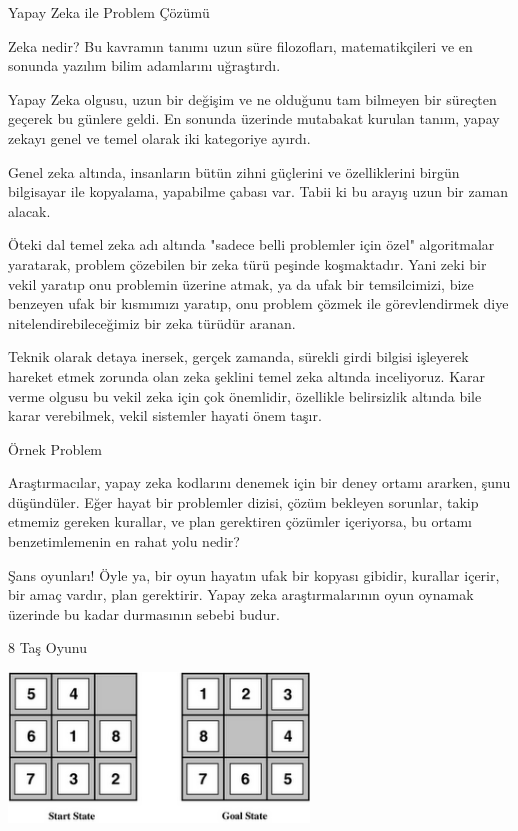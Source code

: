 \documentclass[12pt,fleqn]{article}\usepackage{../../common}
\begin{document}
Yapay Zeka ile Problem Çözümü

Zeka nedir? Bu kavramın tanımı uzun süre filozofları, matematikçileri ve en
sonunda yazılım bilim adamlarını uğraştırdı.

Yapay Zeka olgusu, uzun bir değişim ve ne olduğunu tam bilmeyen bir
süreçten geçerek bu günlere geldi. En sonunda üzerinde mutabakat kurulan
tanım, yapay zekayı genel ve temel olarak iki kategoriye ayırdı.

Genel zeka altında, insanların bütün zihni güçlerini ve özelliklerini
birgün bilgisayar ile kopyalama, yapabilme çabası var. Tabii ki bu arayış
uzun bir zaman alacak.

Öteki dal temel zeka adı altında "sadece belli problemler için özel"
algoritmalar yaratarak, problem çözebilen bir zeka türü peşinde
koşmaktadır. Yani zeki bir vekil yaratıp onu problemin üzerine atmak, ya da
ufak bir temsilcimizi, bize benzeyen ufak bir kısmımızı yaratıp, onu
problem çözmek ile görevlendirmek diye nitelendirebileceğimiz bir zeka
türüdür aranan.

Teknik olarak detaya inersek, gerçek zamanda, sürekli girdi bilgisi
işleyerek hareket etmek zorunda olan zeka şeklini temel zeka altında
inceliyoruz. Karar verme olgusu bu vekil zeka için çok önemlidir, özellikle
belirsizlik altında bile karar verebilmek, vekil sistemler hayati önem
taşır.

Örnek Problem

Araştırmacılar, yapay zeka kodlarını denemek için bir deney ortamı ararken,
şunu düşündüler. Eğer hayat bir problemler dizisi, çözüm bekleyen sorunlar,
takip etmemiz gereken kurallar, ve plan gerektiren çözümler içeriyorsa, bu
ortamı benzetimlemenin en rahat yolu nedir?

Şans oyunları! Öyle ya, bir oyun hayatın ufak bir kopyası gibidir, kurallar
içerir, bir amaç vardır, plan gerektirir. Yapay zeka araştırmalarının oyun
oynamak üzerinde bu kadar durmasının sebebi budur.

8 Taş Oyunu

\includegraphics[height=4cm]{8-puzzle-start.png}
\end{document}
